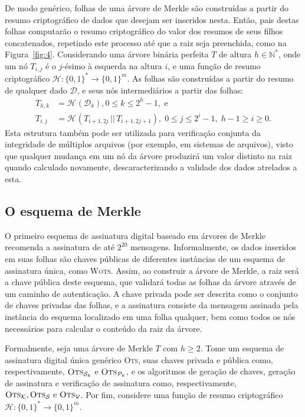 \documentclass[12pt]{report}
\newcommand{\hh}{\mathcal{H}}
\newcommand{\pk}{\mathcal{P}_k}
\newcommand{\sk}{\mathcal{S}_k}
\newcommand{\hash}[2][]{\mathcal{H}^{#1}(#2)}
\newcommand{\concat}{\, \vert \vert \,}
\newcommand{\binwds}[1]{\{0, 1\}^{#1}}
\newcommand{\fhash}[1]{\hh{} : \binwds{*} \longrightarrow \binwds{#1}}
\begin{document}
De modo genérico, folhas de uma árvore de Merkle são construídas a partir do
resumo criptográfico de dados que desejam ser inseridos nesta. Então, pais
destas folhas computarão o resumo criptográfico do valor dos resumos de seus
filhos concatenados, repetindo este processo até que a raiz seja preenchida,
como na Figura~\ref{fig:4}. Considerando uma árvore binária perfeita $T$ de
altura $h \in \mathbb{N}^{*}$, onde um nó $T_{i,j}$ é o $j$-ésimo à esquerda na
altura $i$, e uma função de resumo criptográfico $\fhash{m}$. As folhas são
construídas a partir do resumo de qualquer dado $\mathcal{D}$, e seus nós
intermediários a partir das folhas:
\begin{equation}
  \begin{split}
    T_{h, k} &= \hash{\mathcal{D}_k}, 0 \leq k \leq 2^{h} - 1, \text{ e } \\
    T_{i, j} &= \hash{T_{i + 1, 2j} \concat T_{i + 1, 2j + 1}},
      \; 0 \leq j \leq 2^{i} - 1, \; h - 1 \geq i \geq 0.
  \end{split}
\end{equation}
Esta estrutura também pode ser utilizada para verificação conjunta da
integridade de múltiplos arquivos (por exemplo, em sistemas de arquivos),
visto que qualquer mudança em um nó da
árvore produzirá um valor distinto na raiz quando calculado novamente,
descaracterizando a validade dos dados atrelados a esta.


\subsection{O esquema de Merkle}

O primeiro esquema de assinatura digital baseado em árvores de Merkle
\cite{Merkle:1989:CDS:118209.118230} recomenda a assinatura de até $2^{20}$
mensagens. Informalmente, os dados inseridos em suas folhas são chaves públicas
de diferentes instâncias de um esquema de assinatura única, como \textsc{Wots}.
Assim, ao construir a árvore de Merkle, a raiz será a chave pública deste
esquema, que validará todas as folhas da árvore através de um caminho de
autenticação. A chave privada pode ser descrita como o conjunto de chaves
privadas das folhas, e a assinatura consiste da mensagem assinada pela
instância do esquema localizado em uma folha qualquer, bem como todos os nós
necessários para calcular o conteúdo da raiz da árvore.

Formalmente, seja uma árvore de Merkle $T$ com $h \geq 2$. Tome um esquema de
assinatura digital única genérico \textsc{Ots}, suas chaves privada e pública
como, respectivamente, $\textsc{Ots}_{\sk{}}$ e $\textsc{Ots}_{\pk{}}$, e os
algoritmos de geração de chaves, geração de assinatura e verificação de
assinatura como, respectivamente, $\textsc{Ots}_\mathcal{K},
\textsc{Ots}_\mathcal{S} \text{ e } \textsc{Ots}_\mathcal{V}$. Por fim,
considere uma função de resumo criptográfico $\fhash{m}$.
\end{document}
